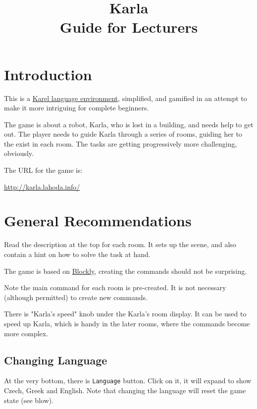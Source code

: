 \documentclass{article}
\begin{document}
\title{Karla\\ \large{Guide for Lecturers}}
\date{}
\maketitle

\section{Introduction}

This is a \href{https://en.wikipedia.org/wiki/Karel_(programming_language)}{Karel language environment},
simplified, and gamified in an attempt to make it more intriguing for complete beginners.

The game is about a robot, Karla, who is lost in a building, and needs help to get
out. The player needs to guide Karla through a series of rooms, guiding her to the
exist in each room. The tasks are getting progressively more challenging, obviously.

The URL for the game is:
\begin{center}
\href{http://karla.lahoda.info/}{http://karla.lahoda.info/}
\end{center}

\section{General Recommendations}

Read the description at the top for each room. It sets up the scene, and also contain
a hint on how to solve the task at hand.

The game is based on \href{https://blockly.games/}{Blockly}, creating the commands
should not be surprising.

Note the main command for each room is pre-created. It is not necessary (although
permitted) to create new commands.

There is "Karla's speed" knob under the Karla's room display. It can be used to speed
up Karla, which is handy in the later rooms, where the commands become more complex.

\subsection{Changing Language}

At the very bottom, there is \texttt{Language} button. Click on it, it will expand
to show Czech, Greek and English. Note that changing the language will reset the game
state (see blow).
\end{document}
